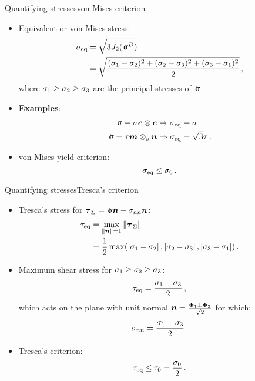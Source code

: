 \begin{frame}{Quantifying stresses}{von Mises criterion}

\begin{itemize}
\item Equivalent or von Mises stress:
\begin{displaymath}
\begin{split}
\stressj_\text{eq} &=\sqrt{3J_2(\stress^D)} \\
&=\sqrt{\frac{(\stressj_1-\stressj_2)^2+(\stressj_2-\stressj_3)^2+(\stressj_3-\stressj_1)^2}{2}}\,,
\end{split}
\end{displaymath}
where $\sigma_1\geq\sigma_2\geq\sigma_3$ are the principal stresses of $\stress$.
\item {\bf Examples}:
\begin{displaymath}
\begin{split}
\stress =\stressj\ev\otimes\ev &\imply\stressj_\text{eq}=\stressj \\
\stress =\tressj\mv\otimes_s\nv &\imply\stressj_\text{eq}=\sqrt{3}\tressj\,.
\end{split}
\end{displaymath}
\item von Mises yield criterion: 
\begin{displaymath}
\sigma_\text{eq}\leq\sigma_0\,.
\end{displaymath}
\end{itemize}

\end{frame}

\begin{frame}{Quantifying stresses}{Tresca's criterion}

\begin{itemize}
\item Tresca's stress for $\tress_\Sigma=\stress\nv-\stressj_{\nj\nj}\nv$: 
\begin{displaymath}
\begin{split}
\tau_\text{eq} &=\max_{\left\|{\boldsymbol{n}}\right\|=1}\left\|{\boldsymbol{\tau}}_\Sigma\right\| \\
&=\frac{1}{2}\max(\left|\sigma_1-\sigma_2\right|,\left|\sigma_2-\sigma_3\right|,\left|\sigma_3-\sigma_1\right|)\,.
\end{split}
\end{displaymath}
\item Maximum shear stress for $\sigma_1\geq\sigma_2\geq\sigma_3$:
\begin{displaymath}
\tau_\text{eq}=\frac{\sigma_1-\sigma_3}{2}\,,
\end{displaymath}
which acts on the plane with unit normal ${\boldsymbol{n}}=\frac{{\boldsymbol\Phi}_1\pm{\boldsymbol\Phi}_3}{\sqrt{2}}$ for which:
\begin{displaymath}
\sigma_{nn}=\frac{\sigma_1+\sigma_3}{2}\,.
\end{displaymath}
\item Tresca's criterion: 
\begin{displaymath}
\tau_\text{eq}\leq\tau_0=\frac{\sigma_0}{2}\,.
\end{displaymath}
\end{itemize}

\end{frame}
